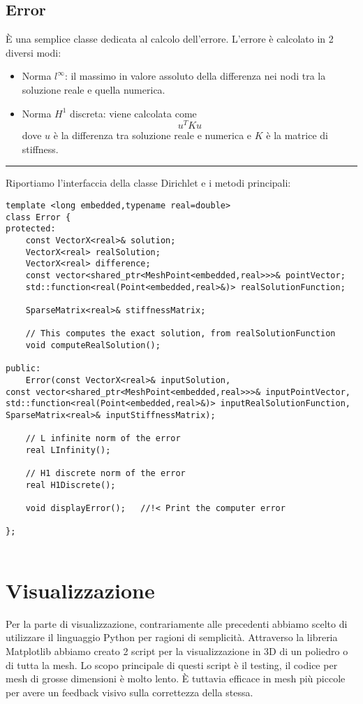 \documentclass[oneside,12pt]{book}  %
\theoremstyle{plain}
\theoremstyle{definition}
\theoremstyle{remark}
\numberwithin{equation}{chapter} %
\begin{document}
\subsection{Error}
\`E una semplice classe dedicata al calcolo dell'errore. L'errore \`e
calcolato in 2 diversi modi:
\begin{itemize}
\item Norma $l^\infty$: il massimo in valore assoluto della differenza
  nei nodi tra la soluzione reale e quella numerica.

\item Norma $H^1$ discreta: viene calcolata come $$u^TKu$$ dove $u$
  \`e la differenza tra soluzione reale e numerica e $K$ \`e la matrice di stiffness.

\end{itemize}

\noindent\rule{14cm}{1pt}

Riportiamo l'interfaccia della classe Dirichlet e i metodi principali:

\begin{verbatim}
template <long embedded,typename real=double>
class Error {
protected:
    const VectorX<real>& solution;
    VectorX<real> realSolution;
    VectorX<real> difference;
    const vector<shared_ptr<MeshPoint<embedded,real>>>& pointVector;
    std::function<real(Point<embedded,real>&)> realSolutionFunction;
	
    SparseMatrix<real>& stiffnessMatrix;
	
    // This computes the exact solution, from realSolutionFunction
    void computeRealSolution(); 
	
public:
    Error(const VectorX<real>& inputSolution,
const vector<shared_ptr<MeshPoint<embedded,real>>>& inputPointVector,
std::function<real(Point<embedded,real>&)> inputRealSolutionFunction,
SparseMatrix<real>& inputStiffnessMatrix);

    // L infinite norm of the error
    real LInfinity();
	
    // H1 discrete norm of the error
    real H1Discrete();
	
    void displayError();   //!< Print the computer error
	
};


\end{verbatim}

\section{Visualizzazione }
\label{sec:visualizzazione}
Per la parte di visualizzazione, contrariamente alle precedenti
abbiamo scelto di utilizzare il linguaggio Python per ragioni di
semplicit\`a. 
Attraverso la libreria Matplotlib abbiamo creato 2 script per la
visualizzazione in 3D di un poliedro o di tutta la mesh. Lo scopo
principale di questi script \`e il testing, il codice per mesh di
grosse dimensioni \`e molto lento. \`E tuttavia efficace in mesh
pi\`u piccole per avere un feedback visivo sulla correttezza della
stessa. 
\end{document}
